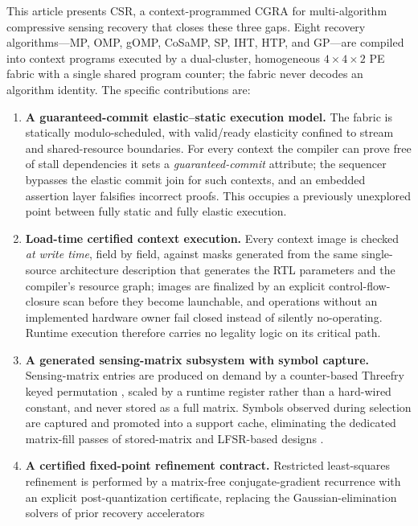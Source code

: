 This article presents CSR, a context-programmed CGRA for multi-algorithm
compressive sensing recovery that closes these three gaps. Eight recovery
algorithms---MP, OMP, gOMP, CoSaMP, SP, IHT, HTP, and GP---are compiled into
context programs executed by a dual-cluster, homogeneous $4{\times}4{\times}2$
PE fabric with a single shared program counter; the fabric never decodes an
algorithm identity. The specific contributions are:

\begin{enumerate}
  \item \textbf{A guaranteed-commit elastic--static execution model.} The
  fabric is statically modulo-scheduled, with valid/ready elasticity confined
  to stream and shared-resource boundaries. For every context the compiler
  can prove free of stall dependencies it sets a \emph{guaranteed-commit}
  attribute; the sequencer bypasses the elastic commit join for such
  contexts, and an embedded assertion layer falsifies incorrect proofs. This
  occupies a previously unexplored point between fully static
  \cite{mei2003adres, ragheb2024cgrame2} and fully elastic \cite{strela2024}
  execution.
  \item \textbf{Load-time certified context execution.} Every context image
  is checked \emph{at write time}, field by field, against masks generated
  from the same single-source architecture description that generates the
  RTL parameters and the compiler's resource graph; images are finalized by
  an explicit control-flow-closure scan before they become launchable, and
  operations without an implemented hardware owner fail closed instead of
  silently no-operating. Runtime execution therefore carries no legality
  logic on its critical path.
  \item \textbf{A generated sensing-matrix subsystem with symbol capture.}
  Sensing-matrix entries are produced on demand by a counter-based Threefry
  keyed permutation \cite{salmon2011random}, scaled by a runtime register
  rather than a hard-wired constant, and never stored as a full matrix.
  Symbols observed during selection are captured and promoted into a support
  cache, eliminating the dedicated matrix-fill passes of stored-matrix and
  LFSR-based designs \cite{george2014lfsr}.
  \item \textbf{A certified fixed-point refinement contract.} Restricted
  least-squares refinement is performed by a matrix-free conjugate-gradient
  recurrence with an explicit post-quantization certificate, replacing the
  Gaussian-elimination solvers of prior recovery accelerators

\end{enumerate}

